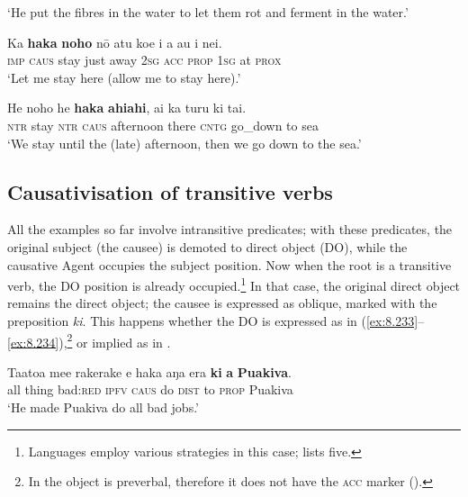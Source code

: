 \glt 
‘He put the fibres in the water to let them rot and ferment in the water.’ \textstyleExampleref{[R352.030]} 
\z

\ea\label{ex:8.231}
\gll Ka \textbf{haka} \textbf{noho} nō atu koe i a au {\ꞌ}i nei. \\
\textsc{imp} \textsc{caus} stay just away \textsc{2sg} \textsc{acc} \textsc{prop} \textsc{1sg} at \textsc{prox} \\

\glt 
‘Let me stay here (allow me to stay here).’ \textstyleExampleref{[R229.013]} 
\z

\ea\label{ex:8.232}
\gll He noho he \textbf{haka} \textbf{ahiahi}, {\ꞌ}ai ka turu ki tai.\\
\textsc{ntr} stay \textsc{ntr} \textsc{caus} afternoon there \textsc{cntg} go\_down to sea\\

\glt 
‘We stay until the (late) afternoon, then we go down to the sea.’ \textstyleExampleref{[R356.008]} 
\z

\subsection{Causativisation of transitive verbs}\label{sec:8.12.3}
All the examples so far involve intransitive predicates; with these predicates, the original subject (the causee) is demoted to direct object (DO), while the causative Agent occupies the subject position. Now when the root is a transitive verb, the DO position is already occupied.\footnote{\label{fn:455}Languages employ various strategies in this case; \citet[256 263]{Dixon2012} lists five.}  In that case, the original direct object remains the direct object; the causee is expressed as oblique, marked with the preposition \textit{ki}. This happens whether the DO is expressed as in (\ref{ex:8.233}–\ref{ex:8.234}),\footnote{\label{fn:456}In  the object is preverbal, therefore it does not have the \textsc{acc} marker ().} or implied as in . 

\ea\label{ex:8.233}
\gll Ta{\ꞌ}ato{\ꞌ}a me{\ꞌ}e rakerake e haka aŋa era \textbf{ki} \textbf{a} \textbf{Puakiva}. \\
all thing bad:\textsc{red} \textsc{ipfv} \textsc{caus} do \textsc{dist} to \textsc{prop} Puakiva \\

\glt 
‘He made Puakiva do all bad jobs.’ \textstyleExampleref{[R229.397]} 
\z


